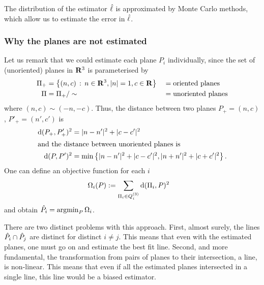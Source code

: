 \documentclass[a4paper,reqno]{amsart}
\begin{document}
The distribution of the estimator $\hat{\ell}$ is approximated by
Monte Carlo methods, which allow us to estimate the error in
$\hat{\ell}$.

\subsubsection{Why the planes are not estimated}
\label{sec:why-no-planes}

Let us remark that we could estimate each plane $P_i$ individually,
since the set of (unoriented) planes in ${\mathbf R}^3$ is parameterised by
\begin{align}
  \label{eq:planes-in-r3}
  \Pi_+ &= \left\{ (n,c) \,:\, n\in{\mathbf R}^3,|n|=1, c\in{\mathbf R} \right\}
  &&=\textrm{oriented planes}\\
  \Pi &= \Pi_+/\sim
  &&=\textrm{unoriented planes}
\end{align}
where $(n,c) \sim (-n,-c)$. Thus, the distance between two planes
$P_+=(n,c)$, $P'_+=(n',c')$ is
\begin{align}
  \label{eq:dplane}
  {\mathrm d}(P_+,P'_+)^2 &= |n-n'|^2 + |c-c'|^2\\
\intertext{and the distance between unoriented planes is}
  {\mathrm d}(P,P')^2 &= \min\left\{ |n-n'|^2 + |c-c'|^2,  |n+n'|^2
    + |c+c'|^2 \right\}.
\end{align}
One can define an objective function for each $i$
\begin{align}
  \label{eq:plane-objectivefn}
  \Omega_i(P) &:= \sum_{\Pi_i \in Q_i^{(3)}} {\mathrm d}(\Pi_i,P)^2
\end{align}
and obtain $\hat{P}_i={\displaystyle\mathrm{argmin}_{P}\,\Omega_i}$.

There are two distinct problems with this approach. First, almost
surely, the lines $\hat{P}_i \cap \hat{P}_j$ are distinct
for distinct $i \neq j$. This means that even with the estimated
planes, one must go on and estimate the best fit line. Second, and
more fundamental, the transformation from pairs of planes to their
intersection, a line, is non-linear. This means that even if all the
estimated planes intersected in a single line, this line would be a
biased estimator.
\end{document}
